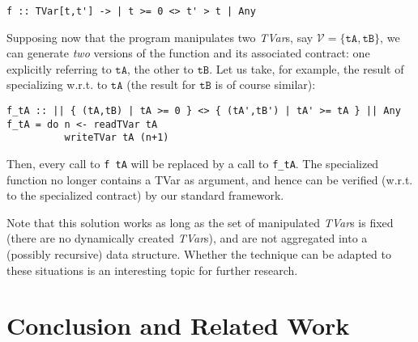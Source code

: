 \documentclass[submission,copyright,creativecommons]{eptcs}
\begin{document}
\begin{footnotesize}
\begin{verbatim}
f :: TVar[t,t'] -> | t >= 0 <> t' > t | Any 
\end{verbatim}
\end{footnotesize}
Supposing now that the program manipulates two \emph{TVar}s, say $\mathcal{V} = \{ \mathtt{tA} , \mathtt{tB} \}$, we can generate \emph{two} versions of the function and its associated contract: one explicitly referring to $\mathtt{tA}$, the other to $\mathtt{tB}$. Let us take, for example, the result of specializing w.r.t. to $\mathtt{tA}$ (the result for $\mathtt{tB}$ is of course similar):



\newcommand{\tun}{tA}
\newcommand{\tdeux}{tB}
\begin{footnotesize}
\begin{verbatim}
f_tA :: || { (tA,tB) | tA >= 0 } <> { (tA',tB') | tA' >= tA } || Any 
f_tA = do n <- readTVar tA
          writeTVar tA (n+1)
\end{verbatim}
\end{footnotesize}
Then, every call to \texttt{f tA} will be replaced by a call to \texttt{f\_tA}. The specialized function no longer contains a TVar as argument, and hence can be verified (w.r.t. to the specialized contract) by our standard framework.

Note that this solution works as long as the set of manipulated \emph{TVar}s is fixed (there are no dynamically created \emph{TVar}s), and are not aggregated into a (possibly recursive) data structure. Whether the technique can be adapted to these situations is an interesting topic for further research.



\section{Conclusion and Related Work}
\label{conclusion}
\end{document}
